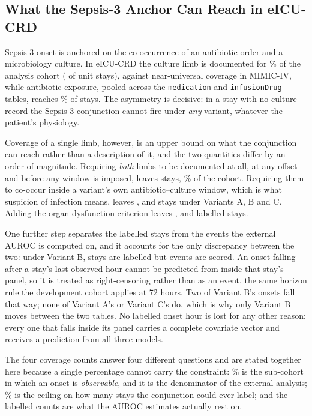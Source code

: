 \subsection{What the Sepsis-3 Anchor Can Reach in eICU-CRD}
\label{sec:external_coverage}

Sepsis-3 onset is anchored on the co-occurrence of an antibiotic order and a
microbiology culture. In eICU-CRD the culture limb is documented for
\pcExtMicroCoverage\% of the analysis cohort (\pcExtNMicroStays{} of
\pcExtNCohortStays{} unit stays), against near-universal coverage in MIMIC-IV,
while antibiotic exposure, pooled across the \texttt{medication} and
\texttt{infusionDrug} tables, reaches \pcExtAbxCoverage\% of stays. The
asymmetry is decisive: in a stay with no culture record the Sepsis-3
conjunction cannot fire under \emph{any} variant, whatever the patient's
physiology.

Coverage of a single limb, however, is an upper bound on what the conjunction
can reach rather than a description of it, and the two quantities differ by an
order of magnitude. Requiring \emph{both} limbs to be documented at all, at
any offset and before any window is imposed, leaves \pcExtNBothLimbStays{}
stays, \pcExtBothLimbCoverage\% of the cohort. Requiring them to co-occur
inside a variant's own antibiotic--culture window, which is what suspicion of
infection means, leaves \pcExtNSuspicionA{}, \pcExtNSuspicionB{} and
\pcExtNSuspicionC{} stays under Variants A, B and C. Adding the
organ-dysfunction criterion leaves \pcExtNOnsetStaysA{},
\pcExtNOnsetStaysB{} and \pcExtNOnsetStaysC{} labelled stays.

One further step separates the labelled stays from the events the external
AUROC is computed on, and it accounts for the only discrepancy between the two:
under Variant B, \pcExtNOnsetStaysB{} stays are labelled but
\pcExtNEventsB{} events are scored. An onset falling after a stay's last
observed hour cannot be predicted from inside that stay's panel, so it is
treated as right-censoring rather than as an event, the same horizon rule the
development cohort applies at 72 hours. Two of Variant B's onsets fall that way;
none of Variant A's or Variant C's do, which is why only Variant B moves between
the two tables. No labelled onset hour is lost for any other reason: every one
that falls inside its panel carries a complete covariate vector and receives a
prediction from all three models.

The four coverage counts
answer four different questions and are stated together here because a single
percentage cannot carry the constraint: \pcExtMicroCoverage\% is the sub-cohort
in which an onset is \emph{observable}, and it is the denominator of the
external analysis; \pcExtBothLimbCoverage\% is the ceiling on how many stays
the conjunction could ever label; and the labelled counts are what the AUROC
estimates actually rest on.

